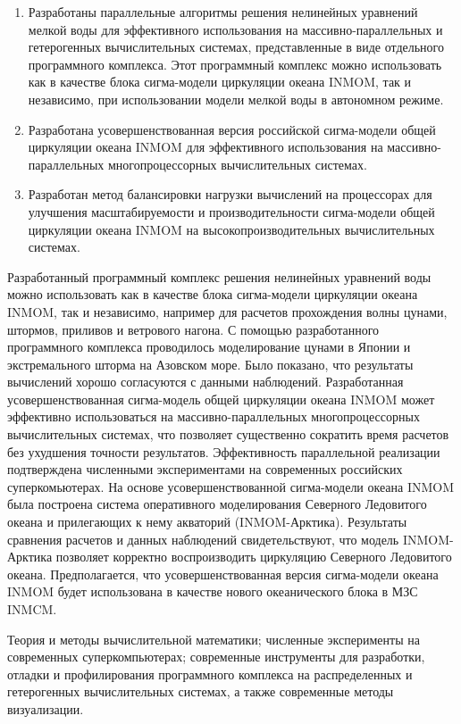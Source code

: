 {\novelty}
\begin{enumerate}[beginpenalty=10000] %
    \item Разработаны параллельные алгоритмы решения нелинейных уравнений мелкой воды для эффективного использования на массивно-параллельных и гетерогенных вычислительных системах, представленные в виде отдельного программного комплекса. Этот программный комплекс можно использовать как в качестве блока сигма-модели циркуляции океана INMOM, так и независимо,
    при использовании модели мелкой воды в автономном режиме.
    \item Разработана усовершенствованная версия российской сигма-модели общей циркуляции океана INMOM для эффективного использования на массивно-параллельных многопроцессорных вычислительных системах.
    \item Разработан метод балансировки нагрузки вычислений на процессорах для улучшения масштабируемости и производительности сигма-модели общей циркуляции океана INMOM на высокопроизводительных вычислительных системах.
\end{enumerate}

{\influence}
Разработанный программный комплекс решения нелинейных уравнений воды можно использовать как в качестве блока сигма-модели циркуляции океана INMOM, так и независимо, например для расчетов прохождения волны цунами, штормов, приливов и ветрового нагона. С помощью разработанного программного комплекса проводилось моделирование цунами в Японии и экстремального шторма на Азовском море. Было показано, что результаты вычислений хорошо согласуются с данными наблюдений.
Разработанная усовершенствованная сигма-модель общей циркуляции океана INMOM может эффективно использоваться на массивно-параллельных многопроцессорных вычислительных системах, что позволяет существенно сократить время расчетов без ухудшения точности результатов. Эффективность параллельной реализации подтверждена численными экспериментами на современных российских суперкомьютерах. На основе усовершенствованной сигма-модели океана INMOM была построена система оперативного моделирования Северного Ледовитого океана и прилегающих к нему акваторий (INMOM-Арктика). Результаты сравнения расчетов и данных наблюдений свидетельствуют, что модель INMOM-Арктика позволяет корректно воспроизводить циркуляцию Северного Ледовитого океана.
Предполагается, что усовершенствованная версия сигма-модели океана INMOM будет использована в качестве нового океанического блока в МЗС INMCM.

{\methods}
Теория и методы вычислительной математики; численные эксперименты на современных суперкомпьютерах; современные инструменты для разработки, отладки и профилирования программного комплекса на распределенных и гетерогенных вычислительных системах, а также современные методы визуализации.

